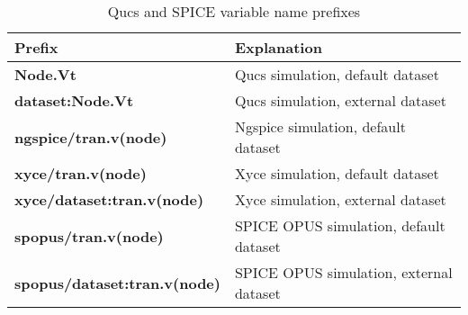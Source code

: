 \begin{table} [h]
	\centering
	\caption{Qucs and SPICE variable name prefixes}
	\label{Table2}
	\begin{tabular}  {|l|l|} \hline
		\textbf{Prefix}                      &   \textbf{Explanation} \\
		\hline
		\textbf{Node.Vt}                     &   Qucs simulation, default dataset   \\
		\textbf{dataset:Node.Vt}             &   Qucs simulation, external dataset     \\
		\textbf{ngspice/tran.v(node)}        &   Ngspice simulation, default dataset     \\
		\textbf{xyce/tran.v(node)}           &   Xyce simulation, default dataset  \\
		\textbf{xyce/dataset:tran.v(node)}   &   Xyce simulation, external dataset     \\
		\textbf{spopus/tran.v(node)}         &   SPICE OPUS simulation, default dataset  \\
		\textbf{spopus/dataset:tran.v(node)} &  SPICE OPUS simulation, external dataset   \\
		\hline
	\end{tabular}
\end{table}

